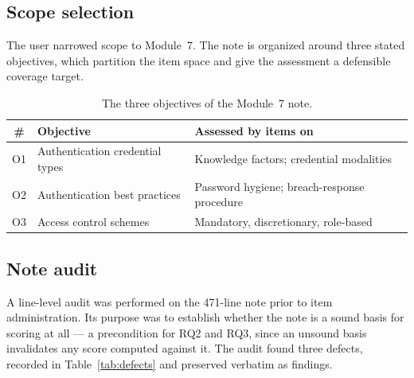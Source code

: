 \documentclass[11pt]{article}
\begin{document}
\subsection{Scope selection}

The user narrowed scope to Module~7. The note is organized around three
stated objectives, which partition the item space and give the assessment a
defensible coverage target.

\begin{table}[htbp]
\centering
\caption{The three objectives of the Module~7 note.}
\label{tab:objectives}
\begin{tabular}{@{}clp{}@{}}
\toprule
\# & Objective & Assessed by items on \\
\midrule
O1 & Authentication credential types        & Knowledge factors; credential modalities \\
O2 & Authentication best practices          & Password hygiene; breach-response procedure \\
O3 & Access control schemes                 & Mandatory, discretionary, role-based \\
\bottomrule
\end{tabular}
\end{table}


\subsection{Note audit}

A line-level audit was performed on the 471-line note prior to item
administration. Its purpose was to establish whether the note is a sound
basis for scoring at all --- a precondition for RQ2 and RQ3, since an
unsound basis invalidates any score computed against it. The audit found
three defects, recorded in Table~\ref{tab:defects} and preserved verbatim
as findings.
\end{document}
